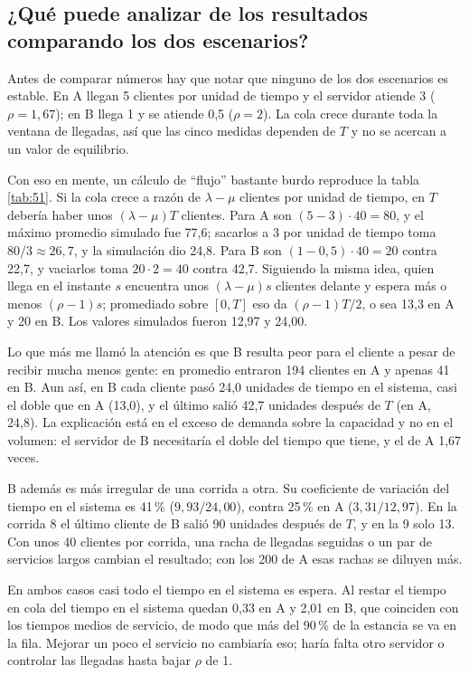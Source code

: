 \documentclass[11pt,letterpaper]{article}
\begin{document}
\subsection{¿Qué puede analizar de los resultados comparando los dos escenarios?}

Antes de comparar números hay que notar que ninguno de los dos escenarios es estable. En A llegan 5 clientes
por unidad de tiempo y el servidor atiende 3 ($\rho = 1{,}67$); en B llega 1 y se atiende 0,5 ($\rho = 2$). La
cola crece durante toda la ventana de llegadas, así que las cinco medidas dependen de $T$ y no se acercan a un
valor de equilibrio.

Con eso en mente, un cálculo de ``flujo'' bastante burdo reproduce la tabla \ref{tab:51}. Si la cola crece a
razón de $\lambda - \mu$ clientes por unidad de tiempo, en $T$ debería haber unos $(\lambda - \mu)T$ clientes. Para
A son $(5 - 3)\cdot 40 = 80$, y el máximo promedio simulado fue 77,6; sacarlos a 3 por unidad de tiempo toma
$80/3 \approx 26{,}7$, y la simulación dio 24,8. Para B son $(1 - 0{,}5)\cdot 40 = 20$ contra 22,7, y vaciarlos
toma $20 \cdot 2 = 40$ contra 42,7. Siguiendo la misma idea, quien llega en el instante $s$ encuentra unos
$(\lambda - \mu)s$ clientes delante y espera más o menos $(\rho - 1)s$; promediado sobre $[0, T]$ eso da
$(\rho - 1)T/2$, o sea 13,3 en A y 20 en B. Los valores simulados fueron 12,97 y 24,00.

Lo que más me llamó la atención es que B resulta peor para el cliente a pesar de recibir mucha menos gente: en
promedio entraron 194 clientes en A y apenas 41 en B. Aun así, en B cada cliente pasó 24,0 unidades de tiempo
en el sistema, casi el doble que en A (13,0), y el último salió 42,7 unidades después de $T$ (en A, 24,8). La
explicación está en el exceso de demanda sobre la capacidad y no en el volumen: el servidor de B necesitaría el
doble del tiempo que tiene, y el de A 1,67 veces.

B además es más irregular de una corrida a otra. Su coeficiente de variación del tiempo en el sistema es 41\,\%
($9{,}93/24{,}00$), contra 25\,\% en A ($3{,}31/12{,}97$). En la corrida 8 el último cliente de B salió 90
unidades después de $T$, y en la 9 solo 13. Con unos 40 clientes por corrida, una racha de llegadas seguidas o
un par de servicios largos cambian el resultado; con los 200 de A esas rachas se diluyen más.

En ambos casos casi todo el tiempo en el sistema es espera. Al restar el tiempo en cola del tiempo en el sistema
quedan 0,33 en A y 2,01 en B, que coinciden con los tiempos medios de servicio, de modo que más del 90\,\% de la
estancia se va en la fila. Mejorar un poco el servicio no cambiaría eso; haría falta otro servidor o controlar
las llegadas hasta bajar $\rho$ de 1.
\end{document}
